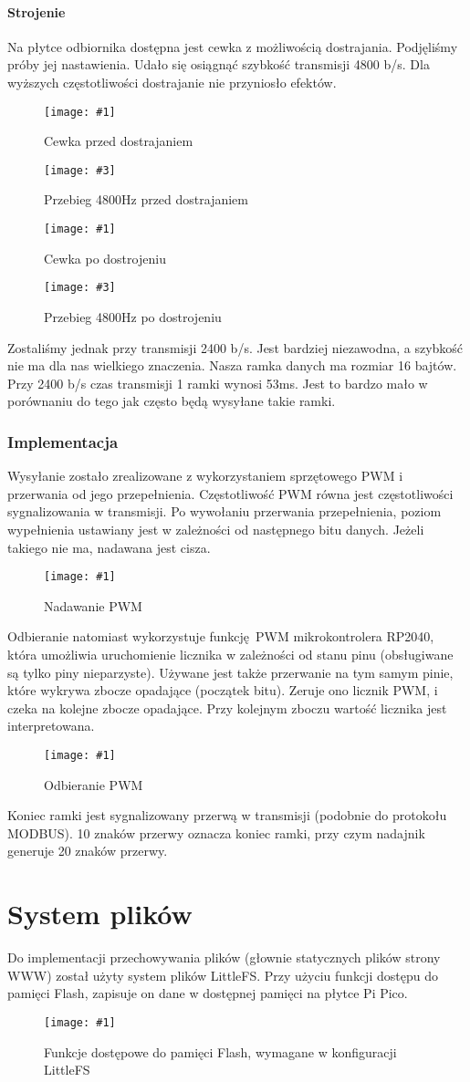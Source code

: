 \documentclass[12pt]{article}
\newcommand{\imgcustomsize}[3]{
	\begin{figure}[H]
		\centering
		\texttt{[image: \#1]}
		\caption{#2}
	\end{figure}
}
\newcommand{\img}[2]{\imgcustomsize{#1}{#2}{0.8}}
\newcommand{\imgsidebyside}[4]{
	\begin{figure}[H]
		\centering
		\begin{minipage}{.45\textwidth}
			\centering
			\texttt{[image: \#1]}
			\caption{#2}
		\end{minipage}%
		\hfill
		\begin{minipage}{.45\textwidth}
			\centering
			\texttt{[image: \#3]}
			\caption{#4}
		\end{minipage}
	\end{figure}
}
\begin{document}
			\paragraph{Strojenie}
			Na płytce odbiornika dostępna jest cewka z możliwością dostrajania. Podjęliśmy próby jej nastawienia. Udało się osiągnąć szybkość transmisji 4800 b/s. Dla wyższych częstotliwości dostrajanie nie przyniosło efektów.
			\imgsidebyside{bauds/tuning/ph_before}{Cewka przed dostrajaniem}{bauds/tuning/4800_before}{Przebieg 4800Hz przed dostrajaniem}
			\imgsidebyside{bauds/tuning/ph_after}{Cewka po dostrojeniu}{bauds/tuning/4800_after}{Przebieg 4800Hz po dostrojeniu}

			Zostaliśmy jednak przy transmisji 2400 b/s. Jest bardziej niezawodna, a szybkość nie ma dla nas wielkiego znaczenia. Nasza ramka danych ma rozmiar 16 bajtów. Przy 2400 b/s czas transmisji 1 ramki wynosi 53ms. Jest to bardzo mało w porównaniu do tego jak często będą wysyłane takie ramki.

			\subsubsection{Implementacja}
				Wysyłanie zostało zrealizowane z wykorzystaniem sprzętowego PWM i przerwania od jego przepełnienia. Częstotliwość PWM równa jest częstotliwości sygnalizowania w transmisji. Po wywołaniu przerwania przepełnienia, poziom wypełnienia ustawiany jest w zależności od następnego bitu danych. Jeżeli takiego nie ma, nadawana jest cisza.
				\imgcustomsize{pgm/pwm_tx}{Nadawanie PWM}{0.6}

				Odbieranie natomiast wykorzystuje funkcję PWM mikrokontrolera RP2040, która umożliwia uruchomienie licznika w zależności od stanu pinu (obsługiwane są tylko piny nieparzyste). Używane jest także przerwanie na tym samym pinie, które wykrywa zbocze opadające (początek bitu). Zeruje ono licznik PWM, i czeka na kolejne zbocze opadające. Przy kolejnym zboczu wartość licznika jest interpretowana.
				\imgcustomsize{pgm/pwm_rx}{Odbieranie PWM}{0.6}
	 			Koniec ramki jest sygnalizowany przerwą w transmisji (podobnie do protokołu MODBUS). 10 znaków przerwy oznacza koniec ramki, przy czym nadajnik generuje 20 znaków przerwy.

	 \section{System plików}
	 	Do implementacji przechowywania plików (głownie statycznych plików strony WWW) został użyty system plików LittleFS. Przy użyciu funkcji dostępu do pamięci Flash, zapisuje on dane w dostępnej pamięci na płytce Pi Pico.
	 	\img{pgm/littlefs}{Funkcje dostępowe do pamięci Flash, wymagane w konfiguracji LittleFS}
\end{document}
